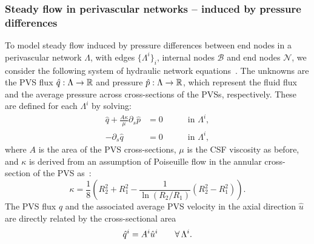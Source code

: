 
\subsubsection{Steady flow in perivascular networks -- induced by pressure differences}

To model steady flow induced by pressure differences between end nodes
in a perivascular network $\Lambda$, with edges $\{\Lambda^i\}_i$,
internal nodes $\mathcal{B}$ and end nodes $\mathcal{N}$, we consider
the following system of hydraulic network
equations~\cite{tithof2022network, daversin2022geometrically,
  gjerde2024directional}. The unknowns are the PVS flux $\hat{q} :
\Lambda \rightarrow \mathbb{R}$ and pressure $\hat{p} : \Lambda
\rightarrow \mathbb{R}$, which represent the fluid flux and the average
pressure across cross-sections of the PVSs, respectively. These are
defined for each $\Lambda^i$ by solving:
\begin{subequations}
\begin{alignat}{2}
  \hat{q} + \frac{A \kappa}{\mu} \partial_{s} \hat{p} & = 0 &&
  \quad \text{ in } \Lambda^i , \\ 
  - \partial_s \hat{q} & = 0 &&
  \quad \text{ in } \Lambda^i ,  
\end{alignat} 
\label{eq:1d_flow}%
\end{subequations}%
where $A$ is the area of the PVS cross-sections, $\mu$ is the CSF viscosity as before, and $\kappa$ is derived from an assumption of Poiseuille flow in the annular cross-section of the PVS as~\cite{tithof2022network}:  
\begin{equation}
\kappa = \frac18 \left( R_2^2 + R_1^2 - \frac{1}{\ln(R_2/R_1)} (R_2^2- R_1^2) \right). 
\end{equation}
The PVS flux $\hat{q}$ and the associated average PVS velocity in the
axial direction $\hat{u}$ are directly related by the cross-sectional area
\begin{equation}
  \hat{q}^i = A^i \hat{u}^i \qquad \forall \, \Lambda^i.
\end{equation}

